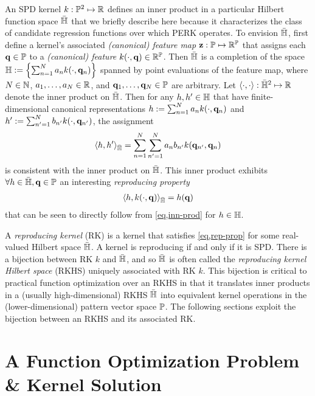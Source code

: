 An SPD kernel $k : \mathbb{P}^2 \mapsto \mathbb{R}$
defines an inner product 
in a particular Hilbert function space ${\bar{\mathbb{H}}}$
that we briefly describe here
because it characterizes
the class of candidate regression functions
over which PERK operates.
To envision ${\bar{\mathbb{H}}}$,
first define a kernel's associated \emph{(canonical) feature map} 
$\mathbf{z} : \mathbb{P} \mapsto \mathbb{R}^{\mathbb{P}}$
that assigns each $\mathbf{q} \in \mathbb{P}$ 
to a \emph{(canonical) feature} $k\paren{\cdot,\bmq} \in \reals{\setQ}$.
Then ${\bar{\mathbb{H}}}$ is a completion 
of the space $\setH := \set{\sum_{n=1}^N a_n k\paren{\cdot,\bmq_n}}$
spanned by point evaluations
of the feature map,
where
$N \in \mathbb{N}$,
$a_1,\dots,a_N \in \mathbb{R}$,
and
$\mathbf{q}_1,\dots,\mathbf{q}_N \in \mathbb{P}$ are arbitrary.
Let $\langle \cdot,\cdot \rangle : {\bar{\mathbb{H}}}^2 \mapsto \mathbb{R}$ 
denote the inner product on ${\bar{\mathbb{H}}}$.
Then for any $h,h' \in \mathbb{H}$
that have finite-dimensional canonical representations
$h := \sum_{n=1}^N a_n k\paren{\cdot,\bmq_n}$ 
and
$h' := \sum_{n'=1}^N b_{n'} k\paren{\cdot,\bmq_{n'}}$,
the assignment
\begin{align}
	\innprod{h}{h'}_\rkhs =
		\sum_{n=1}^N \sum_{n'=1}^N a_n b_{n'} k\paren{\bmq_{n'},\bmq_n}
	\label{eq,inn-prod}
\end{align}
is consistent
with the inner product on ${\bar{\mathbb{H}}}$.
This inner product exhibits $\forall h\in{\bar{\mathbb{H}}}, \mathbf{q}\in\mathbb{P}$
an interesting \emph{reproducing property}
\begin{align}
	\innprod{h}{k\paren{\cdot,\bmq}}_\rkhs = h\paren{\bmq}
	\label{eq,rep-prop}
\end{align}
that can be seen to directly follow 
from \eqref{eq,inn-prod}
for $h \in \mathbb{H}$.

A \emph{reproducing kernel} (RK) is a kernel 
that satisfies \eqref{eq,rep-prop}
for some real-valued Hilbert space ${\bar{\mathbb{H}}}$.
A kernel is reproducing if and only if it is SPD.
There is a bijection between RK $k$ and ${\bar{\mathbb{H}}}$,
and so ${\bar{\mathbb{H}}}$ is often called
the \emph{reproducing kernel Hilbert space} (RKHS)
uniquely associated with RK $k$.
This bijection is critical
to practical function optimization over an RKHS
in that it translates inner products 
in a (usually high-dimensional) RKHS ${\bar{\mathbb{H}}}$
into equivalent kernel operations 
in the (lower-dimensional) pattern vector space $\mathbb{P}$.
The following sections exploit 
the bijection between an RKHS 
and its associated RK.

\section{A Function Optimization Problem \& Kernel Solution}
\label{s,perk,meth}



